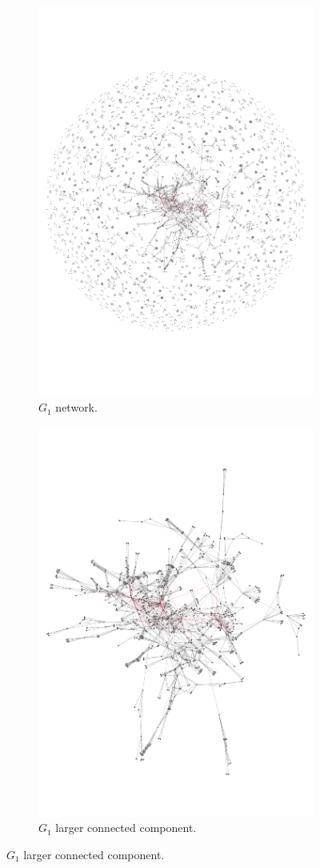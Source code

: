 \documentclass{article}
\theoremstyle{definition}
\begin{document}
\begin{figure}[!hbtp]
    \begin{subfigure}{.45\textwidth}\centering
        \includegraphics[width=.54\textwidth]{./assets/images/pd_network.pdf}
        \caption{\(G_1\) network.}\label{fig:g_one_network}
    \end{subfigure}
    \begin{subfigure}{.45\textwidth}\centering
        \includegraphics[width=.54\textwidth]{./assets/images/pd_network_cluster.pdf}
        \caption{\(G_1\) larger connected component.}\label{fig:g_one_cluster}
     \end{subfigure}
     

\end{figure}
\end{document}

